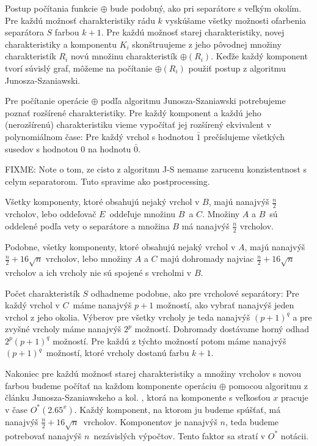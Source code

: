 Postup počítania funkcie $\oplus$ bude podobný, ako pri separátore s veľkým okolím. Pre každú možnosť
charakteristiky rádu $k$ vyskúšame všetky možnosti ofarbenia separátora $S$ farbou $k+1$. Pre každú
možnosť starej charakteristiky, novej charakteristiky a komponentu $K_i$ skonštruujeme z jeho pôvodnej
množiny charakteristík $R_i$ novú množinu charakteristík $\oplus(R_i)$. Keďže každý komponent tvorí súvislý
graf, môžeme na počítanie $\oplus(R_i)$ použiť postup z algoritmu Junosza-Szaniawski.

Pre počítanie operácie $\oplus$ podľa algoritmu Junosza-Szaniawski potrebujeme poznať rozšírené charakteristiky.
Pre každý komponent a každú jeho (nerozšírenú) charakteristiku vieme vypočítať jej rozšírený ekvivalent v
polynomiálnom čase: Pre každý vrchol s hodnotou $\bar{1}$ prečíslujeme všetkých susedov s hodnotou $0$
na hodnotu $\bar{0}$.

FIXME: Note o tom, ze cisto z algoritmu J-S nemame zarucenu konzistentnost s celym separatorom. Tuto
spravime ako postprocessing.

Všetky komponenty, ktoré obsahujú nejaký vrchol v $B$, majú nanajvýš $\frac{n}{2}$ vrcholov, lebo
oddeľovač $E$ oddeľuje množinu $B$ a $C$. Množiny $A$ a $B$ sú oddelené podľa vety o separátore
a množina $B$ má nanajvýš $\frac{n}{2}$ vrcholov.

Podobne, všetky komponenty, ktoré obsahujú nejaký vrchol v $A$, majú nanajvýš $\frac{n}{2} + 16 \sqrt{n}$
vrcholov, lebo množiny $A$ a $C$ majú dohromady najviac $\frac{n}{2} + 16 \sqrt{n}$ vrcholov a ich vrcholy
nie sú spojené s vrcholmi v $B$.

Počet charakteristík $S$ odhadneme podobne, ako pre vrcholové separátory: Pre každý vrchol v $C$ máme
nanajvýš $p+1$ možností, ako vybrať nanajvýš jeden vrchol z jeho okolia. Výberov pre všetky vrcholy je
teda nanajvýš $(p+1)^q$ a pre zvyšné vrcholy máme nanajvýš $2^p$ možností. Dohromady dostávame horný
odhad $2^p (p+1)^q$ možností. Pre každú z týchto možností potom máme nanajvýš $(p+1)^q$ možností, ktoré
vrcholy dostanú farbu $k+1$.

Nakoniec pre každú možnosť starej charakteristiky a množiny vrcholov s novou farbou budeme počítať
na každom komponente operáciu $\oplus$ pomocou algoritmu z článku Junosza-Szaniawskeho a kol. \cite{junosza_fast},
ktorá na komponente s veľkosťou $x$ pracuje v čase $O^*(2.65^x)$. Každý komponent, na ktorom ju budeme
spúšťať, má nanajvýš $\frac{n}{2} + 16\sqrt{n}$ vrcholov. Komponentov je nanajvýš $n$, teda budeme
potrebovať nanajvýš $n$ nezávislých výpočtov. Tento faktor sa stratí v $O^*$ notácii.

